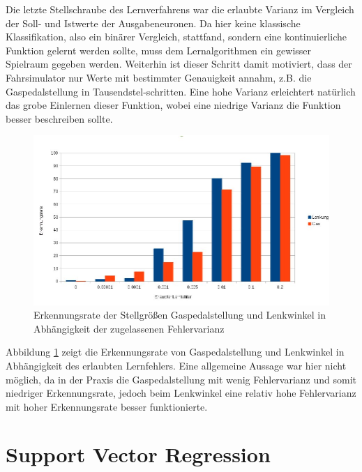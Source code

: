 Die letzte Stellschraube des Lernverfahrens war die erlaubte Varianz im Vergleich der Soll- und Istwerte der Ausgabeneuronen. Da hier keine klassische Klassifikation, also ein binärer Vergleich, stattfand, sondern eine kontinuierliche Funktion gelernt werden sollte, muss dem Lernalgorithmen ein gewisser Spielraum gegeben werden. Weiterhin ist dieser Schritt damit motiviert, dass der Fahrsimulator nur Werte mit bestimmter Genauigkeit annahm, z.B. die Gaspedalstellung in Tausendstel-schritten. Eine hohe Varianz erleichtert natürlich das grobe Einlernen dieser Funktion, wobei eine niedrige Varianz die Funktion besser beschreiben sollte.\\

\begin{figure}[!h]
	\centering
	\includegraphics[scale=0.55]{images/nn/a3.jpg} 
	\caption{Erkennungsrate der Stellgrößen Gaspedalstellung und Lenkwinkel in Abhängigkeit der zugelassenen Fehlervarianz}
	\label{nnchrisa3}
\end{figure}

Abbildung \ref{nnchrisa3} zeigt die Erkennungsrate von Gaspedalstellung und Lenkwinkel in Abhängigkeit des erlaubten Lernfehlers. Eine allgemeine Aussage war hier nicht möglich, da in der Praxis die Gaspedalstellung mit wenig Fehlervarianz und somit niedriger Erkennungsrate, jedoch beim Lenkwinkel eine relativ hohe Fehlervarianz mit hoher Erkennungsrate besser funktionierte. 

\section{Support Vector Regression} %
\label{sec:SVR}

